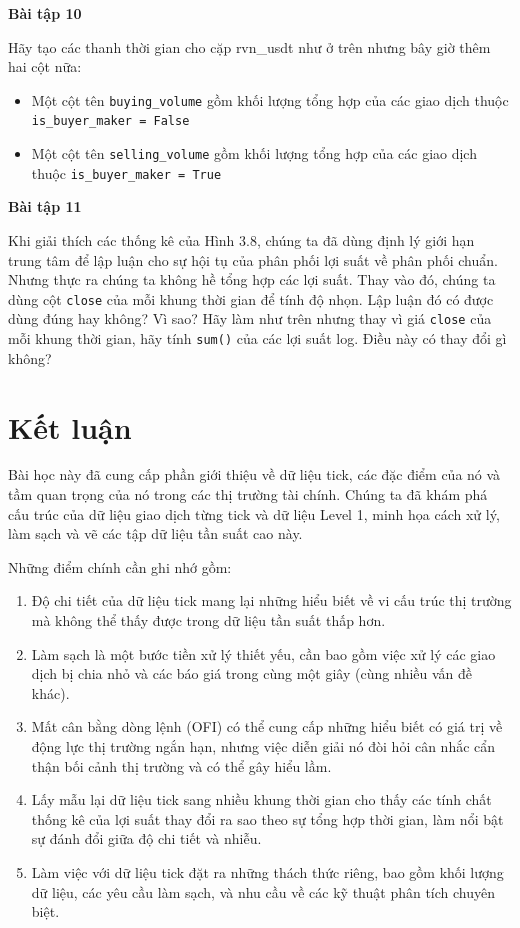 \textbf{Bài tập 10}

Hãy tạo các thanh thời gian cho cặp rvn\_usdt như ở trên nhưng bây giờ thêm hai cột nữa:
\begin{itemize}
  \item Một cột tên \texttt{buying\_volume} gồm khối lượng tổng hợp của các giao dịch thuộc \texttt{is\_buyer\_maker = False}
  \item Một cột tên \texttt{selling\_volume} gồm khối lượng tổng hợp của các giao dịch thuộc \texttt{is\_buyer\_maker = True}
\end{itemize}

\textbf{Bài tập 11}

Khi giải thích các thống kê của Hình 3.8, chúng ta đã dùng định lý giới hạn trung tâm để lập luận cho sự hội tụ của phân phối lợi suất về phân phối chuẩn. Nhưng thực ra chúng ta không hề tổng hợp các lợi suất. Thay vào đó, chúng ta dùng cột \texttt{close} của mỗi khung thời gian để tính độ nhọn. Lập luận đó có được dùng đúng hay không? Vì sao? Hãy làm như trên nhưng thay vì giá \texttt{close} của mỗi khung thời gian, hãy tính \texttt{sum()} của các lợi suất log. Điều này có thay đổi gì không?

\section{Kết luận}

Bài học này đã cung cấp phần giới thiệu về dữ liệu tick, các đặc điểm của nó và tầm quan trọng của nó trong các thị trường tài chính. Chúng ta đã khám phá cấu trúc của dữ liệu giao dịch từng tick và dữ liệu Level 1, minh họa cách xử lý, làm sạch và vẽ các tập dữ liệu tần suất cao này.

Những điểm chính cần ghi nhớ gồm:

\begin{enumerate}
  \item Độ chi tiết của dữ liệu tick mang lại những hiểu biết về vi cấu trúc thị trường mà không thể thấy được trong dữ liệu tần suất thấp hơn.
  \item Làm sạch là một bước tiền xử lý thiết yếu, cần bao gồm việc xử lý các giao dịch bị chia nhỏ và các báo giá trong cùng một giây (cùng nhiều vấn đề khác).
  \item Mất cân bằng dòng lệnh (OFI) có thể cung cấp những hiểu biết có giá trị về động lực thị trường ngắn hạn, nhưng việc diễn giải nó đòi hỏi cân nhắc cẩn thận bối cảnh thị trường và có thể gây hiểu lầm.
  \item Lấy mẫu lại dữ liệu tick sang nhiều khung thời gian cho thấy các tính chất thống kê của lợi suất thay đổi ra sao theo sự tổng hợp thời gian, làm nổi bật sự đánh đổi giữa độ chi tiết và nhiễu.
  \item Làm việc với dữ liệu tick đặt ra những thách thức riêng, bao gồm khối lượng dữ liệu, các yêu cầu làm sạch, và nhu cầu về các kỹ thuật phân tích chuyên biệt.
\end{enumerate}

